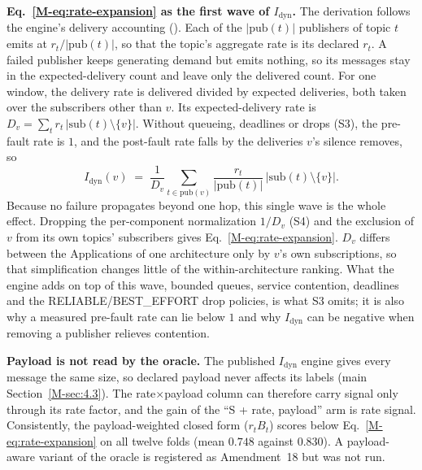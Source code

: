 \noindent\textbf{Eq.~\eqref{M-eq:rate-expansion} as the first wave of $I_{\text{dyn}}$.} The derivation follows the engine's delivery accounting (). Each of the $|\mathrm{pub}(t)|$ publishers of topic $t$ emits at $r_t / |\mathrm{pub}(t)|$, so that the topic's aggregate rate is its declared $r_t$. A failed publisher keeps generating demand but emits nothing, so its messages stay in the expected-delivery count and leave only the delivered count. For one window, the delivery rate is delivered divided by expected deliveries, both taken over the subscribers other than $v$. Its expected-delivery rate is $D_v = \sum_t r_t\, |\mathrm{sub}(t) \setminus \{v\}|$. Without queueing, deadlines or drops (S3), the pre-fault rate is $1$, and the post-fault rate falls by the deliveries $v$'s silence removes, so
\[
I_{\text{dyn}}(v) \;=\; \frac{1}{D_v} \sum_{t \in \mathrm{pub}(v)} \frac{r_t}{|\mathrm{pub}(t)|}\, |\mathrm{sub}(t) \setminus \{v\}|.
\]
Because no failure propagates beyond one hop, this single wave is the whole effect. Dropping the per-component normalization $1/D_v$ (S4) and the exclusion of $v$ from its own topics' subscribers gives Eq.~\eqref{M-eq:rate-expansion}. $D_v$ differs between the Applications of one architecture only by $v$'s own subscriptions, so that simplification changes little of the within-architecture ranking. What the engine adds on top of this wave, bounded queues, service contention, deadlines and the RELIABLE/BEST\_EFFORT drop policies, is what S3 omits; it is also why a measured pre-fault rate can lie below $1$ and why $I_{\text{dyn}}$ can be negative when removing a publisher relieves contention.

\noindent\textbf{Payload is not read by the oracle.} The published $I_{\text{dyn}}$ engine gives every message the same size, so declared payload never affects its labels (main Section~\ref{M-sec:4.3}). The rate$\times$payload column can therefore carry signal only through its rate factor, and the gain of the ``S + rate, payload'' arm is rate signal. Consistently, the payload-weighted closed form ($r_t B_t$) scores below Eq.~\eqref{M-eq:rate-expansion} on all twelve folds (mean $0.748$ against $0.830$). A payload-aware variant of the oracle is registered as Amendment~18 but was not run.

